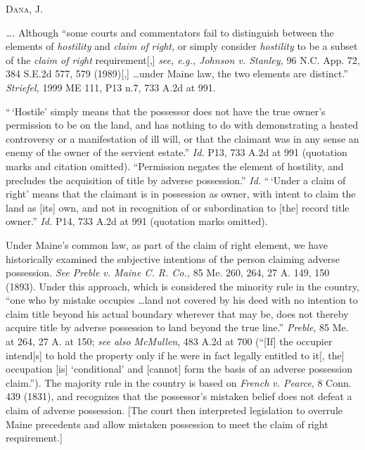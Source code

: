 
\opnion \textsc{Dana}, J.

\ldots. Although ``some courts and commentators fail to distinguish between the
elements of \textit{hostility} and \textit{claim of} \textit{right,} or simply
consider \textit{hostility} to be a subset of the \textit{claim of right}
requirement[,] \textit{see, e.g., Johnson v. Stanley,} 96 N.C. App. 72, 384
S.E.2d 577, 579 (1989)[,]  \ldots under Maine law, the two elements are
distinct.'' \textit{Striefel,} 1999 ME 111, P13 n.7, 733 A.2d at 991.

``\,`Hostile' simply means that the possessor does not have the true owner's
permission to be on the land, and has nothing to do with demonstrating a heated
controversy or a manifestation of ill will, or that the claimant was in any
sense an enemy of the owner of the servient estate.'' \textit{Id.} P13, 733
A.2d at 991 (quotation marks and citation omitted). ``Permission negates the
element of hostility, and precludes the acquisition of title by adverse
possession.'' \textit{Id.} ``\,`Under a claim of right' means that the claimant
is in possession as owner, with intent to claim the land as [its] own, and not
in recognition of or subordination to [the] record title owner.'' \textit{Id.}
P14, 733 A.2d at 991 (quotation marks omitted).

Under Maine's common law, as part of the claim of right element, we have
historically examined the subjective intentions of the person claiming
adverse possession. \textit{See Preble v. Maine C. R. Co.,} 85 Me. 260, 264, 27
A. 149, 150 (1893). Under this approach, which is considered the minority rule
in the country, ``one who by mistake occupies \ldots land not covered by his
deed with no intention to claim title beyond his actual boundary wherever that
may be, does not thereby acquire title by adverse possession to land beyond the
true line.'' \textit{Preble}, 85 Me. at 264, 27 A. at 150; \textit{see also
McMullen}, 483 A.2d at 700 (``[If] the occupier intend[s] to hold the property
only if he were in fact legally entitled to it[, the] occupation [is]
`conditional' and [cannot] form the basis of an adverse possession claim.'').
The majority rule in the country is based on \textit{French v. Pearce}, 8 Conn.
439 (1831), and recognizes that the possessor's mistaken belief does not defeat
a claim of adverse possession. [The court then interpreted legislation to
overrule Maine precedents and allow mistaken possession to meet the claim of
right requirement.]

